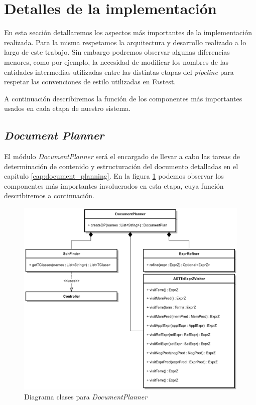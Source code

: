 \section{Detalles de la implementación}

En esta sección detallaremos los aspectos más importantes de la implementación realizada. Para la misma respetamos la arquitectura y desarrollo realizado a lo largo de este trabajo. Sin embargo podremos observar algunas diferencias menores, como por ejemplo, la necesidad de modificar los nombres de las entidades intermedias utilizadas entre las distintas etapas del \textit{pipeline} para respetar las convenciones de estilo utilizadas en Fastest.

A continuación describiremos la función de los componentes más importantes usados en cada etapa de nuestro sistema.

\subsection{\textit{Document Planner}}

El módulo \emph{DocumentPlanner} será el encargado de llevar a cabo las tareas de determinación de contenido y estructuración del documento detalladas en el capítulo \ref{cap:document_planning}. En la figura \ref{fig:imp_documentplanner} podemos observar los componentes más importantes involucrados en esta etapa, cuya función describiremos a continuación. 

\begin{figure}[H]
  	\centering
	\includegraphics[scale=0.25]{img/documentplanner_imp.png}
	\caption{Diagrama clases para \textit{DocumentPlanner}}
  	\label{fig:imp_documentplanner}
\end{figure}

